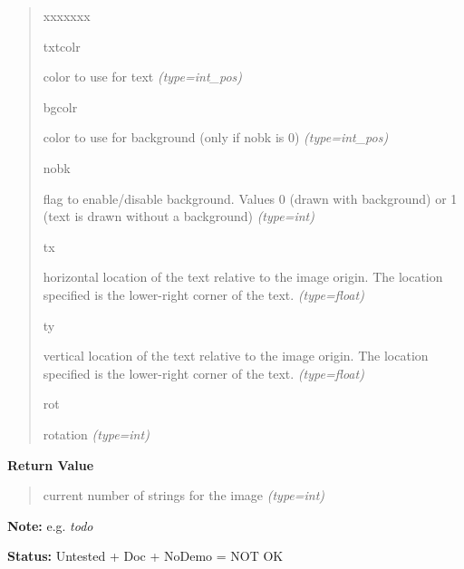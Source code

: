 \begin{boxedminipage}{\funcwidth}
\begin{quote}
\begin{Ventry}{xxxxxxx}
          \item[txtcolr]


color to use for text
            {\it (type=int\_pos)}

          \item[bgcolr]


color to use for background (only if nobk is 0)
            {\it (type=int\_pos)}

          \item[nobk]


flag to enable/disable background. Values 0 (drawn with background)
or 1 (text is drawn without a background)
            {\it (type=int)}

          \item[tx]


horizontal location of the text relative to the image origin. The
location specified is the lower-right corner of the text.
            {\it (type=float)}

          \item[ty]


vertical location of the text relative to the image origin. The
location specified is the lower-right corner of the text.
            {\it (type=float)}

          \item[rot]


rotation
            {\it (type=int)}

        \end{Ventry}

      \end{quote}

      \textbf{Return Value}
    \vspace{-1ex}

      \begin{quote}

current number of strings for the image
      {\it (type=int)}

      \end{quote}

\textbf{Note:} 
e.g. \emph{todo}


\textbf{Status:} 
Untested + Doc + NoDemo = NOT OK


    \end{boxedminipage}

    \label{xformslib:flflimage:flimage_add_text_struct}


